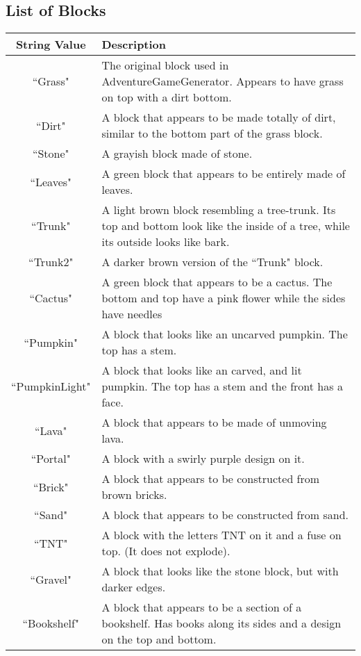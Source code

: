 \documentclass{article}
\begin{document}
\subsection{List of Blocks}
\begin{center}
\begin{tabular}{ | c | m{10cm} | } 
 \hline
 String Value & Description \\ 
  \hline
  ``Grass" & The original block used in AdventureGameGenerator. Appears to have grass on top with a dirt bottom.  \\ 
  \hline
 ``Dirt" & A block that appears to be made totally of dirt, similar to the bottom part of the grass block.\\ 
 \hline
 ``Stone" & A grayish block made of stone.\\ 
 \hline
  ``Leaves" & A green block that appears to be entirely made of leaves.\\ 
 \hline
   ``Trunk" & A light brown block resembling a tree-trunk. Its top and bottom look like the inside of a tree, while its outside looks like bark.\\ 
 \hline
 ``Trunk2" & A darker brown version of the ``Trunk" block.\\ 
 \hline
 ``Cactus" & A green block that appears to be a cactus. The bottom and top have a pink flower while the sides have needles\\ 
 \hline
 ``Pumpkin" & A block that looks like an uncarved pumpkin. The top has a stem. \\ 
 \hline
 ``PumpkinLight" & A block that looks like an carved, and lit pumpkin. The top has a stem and the front has a face. \\ 
 \hline
 ``Lava" & A block that appears to be made of unmoving lava. \\ 
 \hline
 ``Portal" & A block with a swirly purple design on it. \\ 
 \hline
``Brick" & A block that appears to be constructed from brown bricks. \\ 
 \hline
 ``Sand" & A block that appears to be constructed from sand. \\ 
 \hline
  ``TNT" & A block with the letters TNT on it and a fuse on top. (It does not explode). \\ 
 \hline
 ``Gravel" & A block that looks like the stone block, but with darker edges. \\ 
 \hline
  ``Bookshelf" & A block that appears to be a section of a bookshelf. Has books along its sides and a design on the top and bottom.\\ 

\end{tabular}
\end{center}
\end{document}
